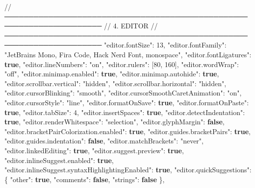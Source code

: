\documentclass[
  doc,
  floatsintext,
  longtable,
  a4paper,
  nolmodern,
  notxfonts,
  notimes,
  12pt,
  colorlinks=true,linkcolor=blue,citecolor=blue,urlcolor=blue]{apa7}
\newenvironment{Shaded}{\begin{snugshade}}{\end{snugshade}}
\newcommand{\DataTypeTok}[1]{\textcolor[rgb]{0.68,0.00,0.00}{#1}}
\newcommand{\DecValTok}[1]{\textcolor[rgb]{0.68,0.00,0.00}{#1}}
\newcommand{\ErrorTok}[1]{\textcolor[rgb]{0.68,0.00,0.00}{#1}}
\newcommand{\FunctionTok}[1]{\textcolor[rgb]{0.28,0.35,0.67}{#1}}
\newcommand{\KeywordTok}[1]{\textcolor[rgb]{0.00,0.23,0.31}{\textbf{#1}}}
\newcommand{\OtherTok}[1]{\textcolor[rgb]{0.00,0.23,0.31}{#1}}
\newcommand{\StringTok}[1]{\textcolor[rgb]{0.13,0.47,0.30}{#1}}
\begin{document}
\begin{Shaded}
\begin{Highlighting}[]
  \ErrorTok{//} \ErrorTok{──────────────────────────────────────────────────────────────────────}
  \ErrorTok{//} \ErrorTok{4.} \ErrorTok{EDITOR}
  \ErrorTok{//} \ErrorTok{──────────────────────────────────────────────────────────────────────}
  \DataTypeTok{"editor.fontSize"}\FunctionTok{:} \DecValTok{13}\FunctionTok{,}
  \DataTypeTok{"editor.fontFamily"}\FunctionTok{:} \StringTok{"\textquotesingle{}JetBrains Mono\textquotesingle{}, \textquotesingle{}Fira Code\textquotesingle{}, \textquotesingle{}Hack Nerd Font\textquotesingle{}, monospace"}\FunctionTok{,}
  \DataTypeTok{"editor.fontLigatures"}\FunctionTok{:} \KeywordTok{true}\FunctionTok{,}
  \DataTypeTok{"editor.lineNumbers"}\FunctionTok{:} \StringTok{"on"}\FunctionTok{,}
  \DataTypeTok{"editor.rulers"}\FunctionTok{:} \OtherTok{[}\DecValTok{80}\OtherTok{,} \DecValTok{160}\OtherTok{]}\FunctionTok{,}
  \DataTypeTok{"editor.wordWrap"}\FunctionTok{:} \StringTok{"off"}\FunctionTok{,}
  \DataTypeTok{"editor.minimap.enabled"}\FunctionTok{:} \KeywordTok{true}\FunctionTok{,}
  \DataTypeTok{"editor.minimap.autohide"}\FunctionTok{:} \KeywordTok{true}\FunctionTok{,}
  \DataTypeTok{"editor.scrollbar.vertical"}\FunctionTok{:} \StringTok{"hidden"}\FunctionTok{,}
  \DataTypeTok{"editor.scrollbar.horizontal"}\FunctionTok{:} \StringTok{"hidden"}\FunctionTok{,}
  \DataTypeTok{"editor.cursorBlinking"}\FunctionTok{:} \StringTok{"smooth"}\FunctionTok{,}
  \DataTypeTok{"editor.cursorSmoothCaretAnimation"}\FunctionTok{:} \StringTok{"on"}\FunctionTok{,}
  \DataTypeTok{"editor.cursorStyle"}\FunctionTok{:} \StringTok{"line"}\FunctionTok{,}
  \DataTypeTok{"editor.formatOnSave"}\FunctionTok{:} \KeywordTok{true}\FunctionTok{,}
  \DataTypeTok{"editor.formatOnPaste"}\FunctionTok{:} \KeywordTok{true}\FunctionTok{,}
  \DataTypeTok{"editor.tabSize"}\FunctionTok{:} \DecValTok{4}\FunctionTok{,}
  \DataTypeTok{"editor.insertSpaces"}\FunctionTok{:} \KeywordTok{true}\FunctionTok{,}
  \DataTypeTok{"editor.detectIndentation"}\FunctionTok{:} \KeywordTok{true}\FunctionTok{,}
  \DataTypeTok{"editor.renderWhitespace"}\FunctionTok{:} \StringTok{"selection"}\FunctionTok{,}
  \DataTypeTok{"editor.glyphMargin"}\FunctionTok{:} \KeywordTok{false}\FunctionTok{,}
  \DataTypeTok{"editor.bracketPairColorization.enabled"}\FunctionTok{:} \KeywordTok{true}\FunctionTok{,}
  \DataTypeTok{"editor.guides.bracketPairs"}\FunctionTok{:} \KeywordTok{true}\FunctionTok{,}
  \DataTypeTok{"editor.guides.indentation"}\FunctionTok{:} \KeywordTok{false}\FunctionTok{,}
  \DataTypeTok{"editor.matchBrackets"}\FunctionTok{:} \StringTok{"never"}\FunctionTok{,}
  \DataTypeTok{"editor.linkedEditing"}\FunctionTok{:} \KeywordTok{true}\FunctionTok{,}
  \DataTypeTok{"editor.suggest.preview"}\FunctionTok{:} \KeywordTok{true}\FunctionTok{,}
  \DataTypeTok{"editor.inlineSuggest.enabled"}\FunctionTok{:} \KeywordTok{true}\FunctionTok{,}
  \DataTypeTok{"editor.inlineSuggest.syntaxHighlightingEnabled"}\FunctionTok{:} \KeywordTok{true}\FunctionTok{,}
  \DataTypeTok{"editor.quickSuggestions"}\FunctionTok{:} \FunctionTok{\{}
    \DataTypeTok{"other"}\FunctionTok{:} \KeywordTok{true}\FunctionTok{,}
    \DataTypeTok{"comments"}\FunctionTok{:} \KeywordTok{false}\FunctionTok{,}
    \DataTypeTok{"strings"}\FunctionTok{:} \KeywordTok{false}
  \FunctionTok{\},}


\end{Highlighting}
\end{Shaded}
\end{document}
